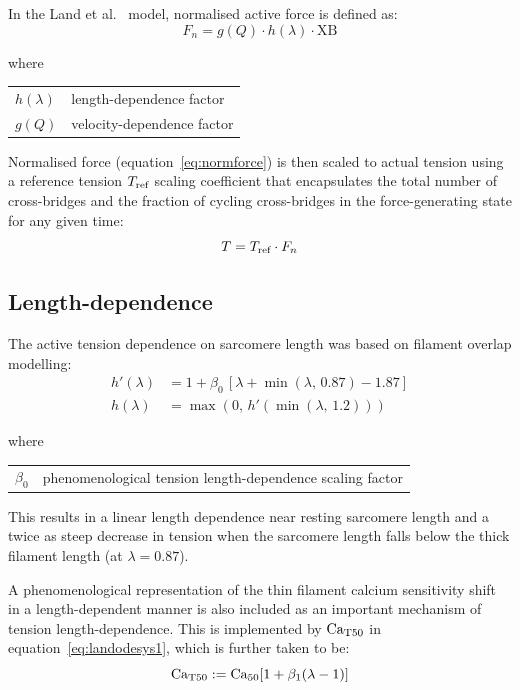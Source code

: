 \vspace{0.2cm}
In the Land et al.~\cite{Land:2012} model, normalised active force is defined as:
%
\begin{equation}\label{eq:normforce}
    F_n = g(Q)\cdot h(\lambda)\cdot \text{XB}
\end{equation}

\noindent
where

\vspace{0.2cm}
\begin{tabular}{ll}
    $h(\lambda)$ & length-dependence factor \\
    $g(Q)$       & velocity-dependence factor
\end{tabular}

\vspace{0.2cm}\noindent
Normalised force (equation~\eqref{eq:normforce}) is then scaled to actual tension using a reference tension $T_{\textrm{ref}}$ scaling coefficient that encapsulates the total number of cross-bridges and the fraction of cycling cross-bridges in the force-generating state for any given time:
%
\begin{equation}
    T = T_{\textrm{ref}}\cdot F_n
\end{equation}


%
%
%
\subsection{Length-dependence}\label{sec:ch2lengthdependence}
The active tension dependence on sarcomere length was based on filament overlap modelling:
%
\begin{align}
    h'(\lambda) &= 1+\beta_0\,[\lambda+\min(\lambda,\,0.87)-1.87] \\
    h(\lambda) &= \max(0,\,h'(\min(\lambda,\,1.2)))
\end{align}

\noindent
where

\vspace{0.2cm}
\begin{tabular}{ll}
    $\beta_0$ & phenomenological tension length-dependence scaling factor
\end{tabular}

\vspace{0.2cm}\noindent
This results in a linear length dependence near resting sarcomere length and a twice as steep decrease in tension when the sarcomere length falls below the thick filament length (at $\lambda = 0.87$).

\vspace{0.2cm}
A phenomenological representation of the thin filament calcium sensitivity shift in a length-dependent manner is also included as an important mechanism of tension length-dependence. This is implemented by $\textrm{Ca}_{\textrm{T}50}$ in equation~\eqref{eq:landodesys1}, which is further taken to be:
%
\begin{equation}\label{eq:Caift}
    \textrm{Ca}_{\textrm{T}50}:=\textrm{Ca}_{50}[1 + \beta_1(\lambda - 1)]
\end{equation}

